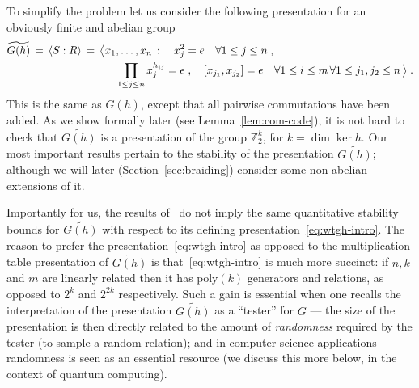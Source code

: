 \documentclass[11pt]{article}
\theoremstyle{definition}
\newcommand{\Z}{\ensuremath{\mathbb{Z}}}
\begin{document}
To simplify the problem let us consider the following presentation for an obviously finite and abelian group
\begin{align}
  \widetilde{G(h)} \,=\, \langle S:R\rangle \,=\, \big\langle &x_1,\ldots,x_n \,:\quad  x_j^2=e\quad \forall 1\leq j\leq n\;,\notag\\
 & \quad \prod_{1\leq j \leq n} x_j^{h_{ij}} = e\;,\quad [x_{j_1},x_{j_2}]=e\quad \forall 1\leq i\leq m\,\forall 1\leq j_1,j_2\leq n\,\big\rangle\;.\label{eq:wtgh-intro}
 \end{align}
This is the same as $G(h)$, except that all pairwise commutations have been added. As we show formally later (see Lemma~\ref{lem:com-code}), it is not hard to check that $\widetilde{G(h)}$ is a presentation of the group $\Z_2^k$, for $k=\dim\ker h$. Our most important results pertain to the stability of the presentation $\widetilde{G(h)}$; although we will later (Section~\ref{sec:braiding}) consider some non-abelian extensions of it. 

\newcommand{\wtG}{\widetilde{G(h)}}

Importantly for us, the results of~\cite{gowers2017inverse,de2019operator} do not imply the same quantitative stability bounds for $\wtG$ with respect to its defining presentation~\eqref{eq:wtgh-intro}. The reason to prefer the presentation~\eqref{eq:wtgh-intro} as opposed to the multiplication table presentation of $\wtG$ is that~\eqref{eq:wtgh-intro} is much more succinct: if $n,k$ and $m$ are linearly related then it has $\textrm{poly}(k)$ generators and relations, as opposed to $2^k$ and $2^{2k}$ respectively. Such a gain is essential when one recalls the interpretation of the presentation $\wtG$ as a ``tester'' for $G$ --- the size of the presentation is then directly related to the amount of \emph{randomness} required by the tester (to sample a random relation); and in computer science applications randomness is seen as an essential resource (we discuss this more below, in the context of quantum computing). 

\end{document}
